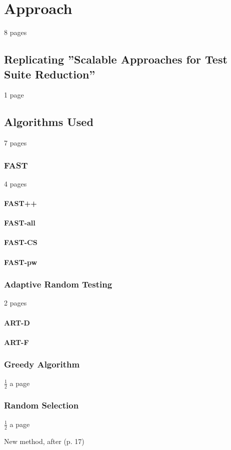 
\chapter{Approach}\label{chapter:approach}

8 pages

\section{Replicating ''Scalable Approaches for Test Suite Reduction''}

1 page

\section{Algorithms Used}

7 pages

\subsection{FAST}

4 pages

\subsubsection{FAST++}

\subsubsection{FAST-all}

\subsubsection{FAST-CS}

\subsubsection{FAST-pw}

\subsection{Adaptive Random Testing}

2 pages

\subsubsection{ART-D}

\subsubsection{ART-F}

\subsection{Greedy Algorithm}

$\frac{1}{2}$ a page

\subsection{Random Selection}

$\frac{1}{2}$ a page

New method, after \cite{khan2018systematic} (p. 17)
